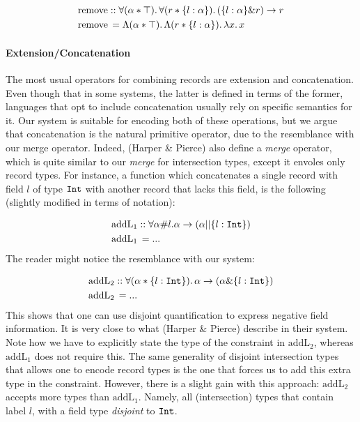 \begin{align*}
&\text{remove} :: \forall (\alpha * \top).\, \forall (r * \{ l : \alpha \}).\, ({\{ l : \alpha \} \& r) \rightarrow r} \\ 
&\text{remove} \, = \Lambda (\alpha * \top).\, \Lambda (r * \{ l : \alpha \}).\, \lambda x.\, x 
\end{align*}

\paragraph{Extension/Concatenation}

The most usual operators for combining records are extension and concatenation.
Even though that in some systems, the latter is defined in terms of the former, languages that
opt to include concatenation usually rely on specific semantics for it. 
Our system is suitable for encoding both of these operations, but we argue that concatenation is
the natural primitive operator, due to the resemblance with our merge operator.
Indeed, (Harper \& Pierce) also define a \emph{merge} operator, which is quite similar to
our \emph{merge} for intersection types, except it envoles only record types.
For instance, a function which concatenates a single record with field $l$ of type $\texttt{Int}$
with another record that lacks this field, is the following (slightly modified in terms of 
notation):

\begin{align*}
&\text{addL}_1 :: \forall \alpha\#l. \alpha \rightarrow (\alpha || \{ l : \texttt{Int} \}) \\ 
&\text{addL}_1 \, = ...
\end{align*}
The reader might notice the resemblance with our system:

\begin{align*}
&\text{addL}_2 :: \forall (\alpha * \{ l : \texttt{Int} \}).\, 
\alpha \rightarrow (\alpha \& \{ l : \texttt{Int} \}) \\
&\text{addL}_2 \, = ...
\end{align*}
This shows that one can use disjoint quantification to express negative field information.
It is very close to what (Harper \& Pierce) describe in their system.  
Note how we have to explicitly state the type of the constraint in $\text{addL}_2$, whereas 
$\text{addL}_1$ does not require this.
The same generality of disjoint intersection types that allows one to encode record types is the
one that forces us to add this extra type in the constraint.
However, there is a slight gain with this approach: $\text{addL}_2$ accepts more types than
$\text{addL}_1$.
Namely, all (intersection) types that contain label $l$, with a field type \emph{disjoint} to
$\texttt{Int}$.

